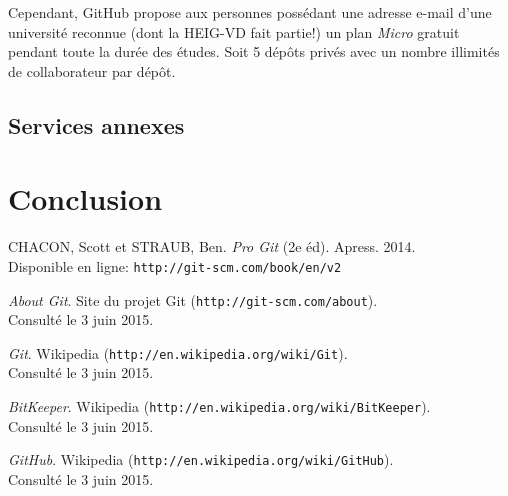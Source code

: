 \documentclass[11pt,a4paper]{article}
\begin{document}
Cependant, GitHub propose aux personnes possédant une adresse e-mail d'une université reconnue (dont la HEIG-VD fait partie!) un plan \textit{Micro} gratuit pendant toute la durée des études. Soit 5 dépôts privés avec un nombre illimités de collaborateur par dépôt.

\subsection{Services annexes}

\section{Conclusion}

\pagebreak
{}

\begin{thebibliography}{1}

	CHACON, Scott et STRAUB, Ben. {\em Pro Git} (2e éd). Apress. 2014. \\
	Disponible en ligne: {\tt http://git-scm.com/book/en/v2}

	{\em About Git}. Site du projet Git ({\tt http://git-scm.com/about}). \\
	Consulté le 3 juin 2015.

	{\em Git}. Wikipedia ({\tt http://en.wikipedia.org/wiki/Git}). \\
	Consulté le 3 juin 2015.

	{\em BitKeeper}. Wikipedia ({\tt http://en.wikipedia.org/wiki/BitKeeper}). \\
	Consulté le 3 juin 2015.

	{\em GitHub}. Wikipedia ({\tt http://en.wikipedia.org/wiki/GitHub}). \\
	Consulté le 3 juin 2015.
	
\end{thebibliography}
\end{document}
